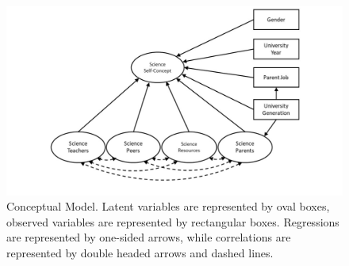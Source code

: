\begin{figure}
 \includegraphics[width = \linewidth]{C4 - Science Capital Self-Concept/ConceptualModel.jpg}
\caption{Conceptual Model. Latent variables are represented by oval boxes, observed variables are represented by rectangular boxes. Regressions are represented by one-sided arrows, while correlations are represented by double headed arrows and dashed lines. }
\label{fig:ConceptualModel_C4}       
\end{figure}


